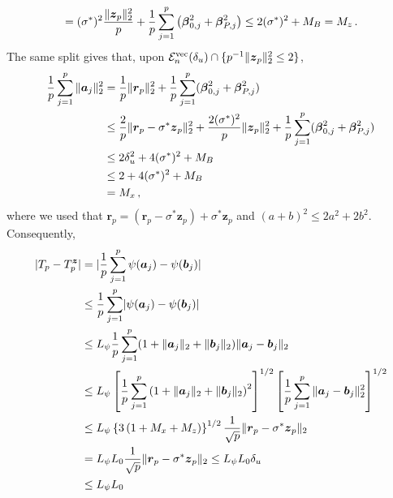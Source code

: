 \documentclass{article}
\makeatletter
\theoremstyle{definition}
\newcommand{\vnorm}[1]{%
	\ensuremath{%
		\if@display
		\left\| #1 \right\|
		\else
		\| #1 \|
		\fi
	}%
}
\newcommand{\abs}[1]{%
	\ensuremath{%
		\if@display
		\left| #1 \right|
		\else
		\lvert #1 \rvert
		\fi
	}%
}
\newcommand*{\bb}{\boldsymbol}
\def\bbeta{\bb{\beta}}
\makeatother
\begin{document}
\begin{bibunit}
$$    =
    (\sigma^*)^2
    \frac{\vnorm{\bb z_p}_2^2}{p}
    +
    \frac1p
    \sum_{j=1}^p
    \left(
        \bbeta_{0,j}^2+\bbeta_{P,j}^2
    \right)
    \leq
    2(\sigma^*)^2+M_B
    =
    M_z\,.
$$
The same split gives that, upon $\mathcal E_n^{\mathrm{vec}}(\delta_u) \cap \{p^{-1}\vnorm{\bb z_p}_2^2\leq2\}$, 
\begin{equation}
    \label{eq:split-one} 
     \begin{aligned}
      \frac1p\sum_{j=1}^p\vnorm{\bb a_j}_2^2
    &=
    \frac1p\vnorm{\bb r_p}_2^2
    +
      \frac1p\sum_{j=1}^p(\bbeta_{0,j}^2+\bbeta_{P,j}^2) \\ 
      & \leq \frac2p\vnorm{\bb r_p - \sigma^* \bb z_p}_2^2 + \frac{2(\sigma^*)^2}p \vnorm{\bb z_p}_2^2 +
      \frac1p\sum_{j=1}^p(\bbeta_{0,j}^2+\bbeta_{P,j}^2) \\  
      &\leq 2 \delta_u^2 + 4(\sigma^*)^2 + M_B \\ 
      & \leq 2 + 4(\sigma^*)^2 + M_B \\ 
      & = M_x \,, 
   \end{aligned}
\end{equation}
where we used that 
$\bb r_p=(\bb r_p-\sigma^*\bb z_p)+\sigma^*\bb z_p$ and
$(a+b)^2\leq2a^2+2b^2$. 
Consequently,
\begin{equation}
    \label{eq:pl-expansion} 
    \begin{aligned}
    \abs{
        T_p-T_p^{\bb z}
    }
    & = 
    \abs{ \frac1p \sum_{j = 1}^p  \psi(\bb a_j) - \psi(\bb b_j) } \\
    &\leq \frac1p \sum_{j = 1}^p  \abs{\psi(\bb a_j) - \psi(\bb b_j) } \\ 
    &\leq  
    L_\psi\frac1p \sum_{j = 1}^p (1 + \vnorm{\bb a_j}_2 + \vnorm{\bb b_j}_2) \vnorm{\bb a_j - \bb b_j}_2 \\ 
    &\leq   L_\psi
    \left[
        \frac1p
        \sum_{j=1}^p
        \left(
            1+\vnorm{\bb a_j}_2+\vnorm{\bb b_j}_2
        \right)^2
    \right]^{1/2}
    \left[
        \frac1p
        \sum_{j=1}^p
        \vnorm{\bb a_j-\bb b_j}_2^2
    \right]^{1/2}
    \\
    &\leq
    L_\psi
    \left\{
        3
        \left(
            1+M_x+M_z
        \right)
    \right\}^{1/2}
    \frac1{\sqrt p}
    \vnorm{
        \bb r_p-\sigma^*\bb z_p
    }_2
    \\
    &=
    L_\psi L_0
    \frac1{\sqrt p}
    \vnorm{
        \bb r_p-\sigma^*\bb z_p
    }_2
    \leq
    L_\psi L_0\delta_u
    \\
    &\leq
    L_\psi L_0

\end{aligned}
\end{equation}
\end{bibunit}
\end{document}
